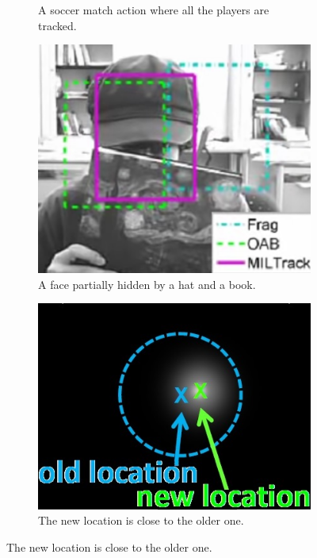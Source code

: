 \begin{figure}[!h]
\begin{subfigure}[!h]{0.49\textwidth}
		\caption{A soccer match action where all the players are tracked.}
		\label{fig:challenge_multiple}
	\end{subfigure}
	\begin{subfigure}[!h]{0.29\textwidth}
		\includegraphics[width=\linewidth]{images/tracking/challenge_partialOcclusion}
		\caption{A face partially hidden by a hat and a book.}
		\label{fig:challenge_partialOcclusion}
	\end{subfigure}
	\begin{subfigure}[!h]{0.49\textwidth}
		\includegraphics[width=\linewidth]{images/tracking/challenge_proximity}
		\caption{The new location is close to the older one.}

\end{subfigure}
\end{figure}
